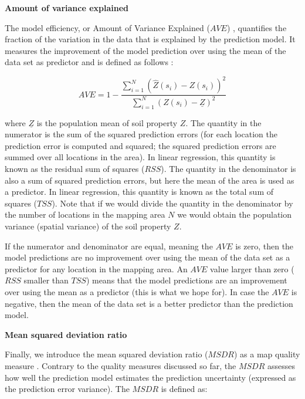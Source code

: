 \documentclass[10pt,b5paper,]{book}
\theoremstyle{definition}
\theoremstyle{definition}
\theoremstyle{definition}
\theoremstyle{remark}
\begin{document}
\textbf{Amount of variance explained}

The model efficiency, or Amount of Variance Explained (\({AVE}\))
\citep[\citet{samuel2015more}]{angelini2016mapping}, quantifies the
fraction of the variation in the data that is explained by the
prediction model. It measures the improvement of the model prediction
over using the mean of the data set as predictor and is defined as
follows \citep{krause2005comparison}:

\begin{equation}
A V E = 1 -  \frac{\sum_{i=1}^{N} (\hat{Z}(s_i) - Z(s_i))^2}{\sum_{i=1}^{N}  (Z(s_i) - \underline{Z})^2}
\end{equation}

where \({\underline{Z}}\) is the population mean of soil property \(Z\).
The quantity in the numerator is the sum of the squared prediction
errors (for each location the prediction error is computed and squared;
the squared prediction errors are summed over all locations in the
area). In linear regression, this quantity is known as the residual sum
of squares (\({RSS}\)). The quantity in the denominator is also a sum of
squared prediction errors, but here the mean of the area is used as a
predictor. In linear regression, this quantity is known as the total sum
of squares (\({TSS}\)). Note that if we would divide the quantity in the
denominator by the number of locations in the mapping area \(N\) we
would obtain the population variance (spatial variance) of the soil
property \(Z\).

If the numerator and denominator are equal, meaning the \({AVE}\) is
zero, then the model predictions are no improvement over using the mean
of the data set as a predictor for any location in the mapping area. An
\({AVE}\) value larger than zero (\({RSS}\) smaller than \({TSS}\))
means that the model predictions are an improvement over using the mean
as a predictor (this is what we hope for). In case the \({AVE}\) is
negative, then the mean of the data set is a better predictor than the
prediction model.

\textbf{Mean squared deviation ratio}

Finally, we introduce the mean squared deviation ratio (\({MSDR}\)) as a
map quality measure \citep[\citet{lark2000comparison},
\citet{voltz1990comparison},
\citet{webster_2007}]{kempen2010pedometric}. Contrary to the quality
measures discussed so far, the \({MSDR}\) assesses how well the
prediction model estimates the prediction uncertainty (expressed as the
prediction error variance). The \({MSDR}\) is defined as:
\end{document}
